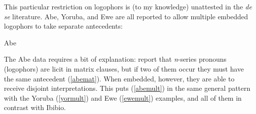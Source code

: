 \documentclass[output=paper]{langscibook}
\begin{document}
This particular restriction on logophors is (to my knowledge) unattested in the \textit{de se} literature. Abe, Yoruba, and Ewe are all reported to allow multiple embedded logophors to take separate antecedents:
\begin{exe}
	\ex Abe \citep[41, 44a]{Koopman1989} \begin{xlist} 
		\label{abemat}
	\label{abemult}
			\end{xlist}
			
	\label{yormult}
			
	\label{ewemult}
\end{exe}
The Abe data requires a bit of explanation: \citet{Koopman1989} report that \textit{n}-series pronouns (logophors) are licit in matrix clauses, but if two of them occur they must have the same antecedent (\ref{abemat}). When embedded, however, they are able to receive disjoint interpretations. This puts (\ref{abemult}) in the same general pattern with the Yoruba (\ref{yormult}) and Ewe (\ref{ewemult}) examples, and all of them in contrast with Ibibio.
\end{document}
